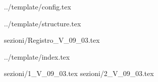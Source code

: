  {../template/config.tex}


\def\DOCUMENTO{Verbale 2016-03-09}
\def\VERSIONE{1.0.0}

\def\DESCRIZIONE{<Info documento>}

\def\REDATTORE {Francesco Bizzaro, Gino Zaidan}
\def\VERIFICATORE {Riccardo Rizzo}
\def\RESPONSABILE {Alberto Andriolo, Enrico Chiara}

\def\USO {Esterno}

\def\DISTRIBUZIONE {\GRUPPO{}\\ & \COMMITTENTE{}\\}

\def\DESCRIZIONE {Verbale del primo incontro in data 09-03-2016 con Giulio 
Paci.}


\def\INDICE	{true}
\def\TABELLE {false}
\def\FIGURE {false}


 {../template/structure.tex}

 {sezioni/Registro_V_09_03.tex}

 {../template/index.tex}

 {sezioni/1_V_09_03.tex}
 {sezioni/2_V_09_03.tex}





